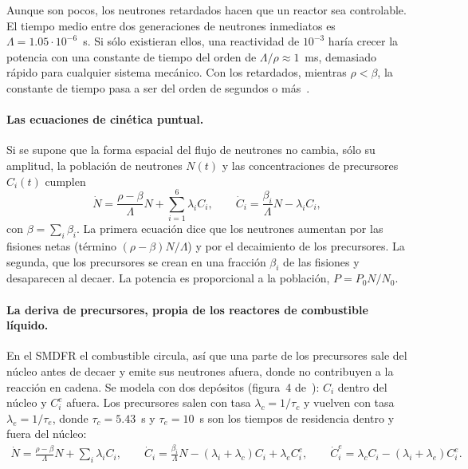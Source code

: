Aunque son pocos, los neutrones retardados hacen que un reactor sea controlable. El tiempo
medio entre dos generaciones de neutrones inmediatos es $\Lambda=1.05\cdot10^{-6}$~s. Si sólo
existieran ellos, una reactividad de $10^{-3}$ haría crecer la potencia con una constante de
tiempo del orden de $\Lambda/\rho\approx1$~ms, demasiado rápido para cualquier sistema
mecánico. Con los retardados, mientras $\rho<\beta$, la constante de tiempo pasa a ser del
orden de segundos o más~\cite{hetrick1971}.

\paragraph{Las ecuaciones de cinética puntual.} Si se supone que la forma espacial del flujo
de neutrones no cambia, sólo su amplitud, la población de neutrones $N(t)$ y las
concentraciones de precursores $C_i(t)$ cumplen
\[
\dot N=\frac{\rho-\beta}{\Lambda}N+\sum_{i=1}^{6}\lambda_iC_i,\qquad
\dot C_i=\frac{\beta_i}{\Lambda}N-\lambda_iC_i,
\]
con $\beta=\sum_i\beta_i$. La primera ecuación dice que los neutrones aumentan por las
fisiones netas (término $(\rho-\beta)N/\Lambda$) y por el decaimiento de los precursores. La
segunda, que los precursores se crean en una fracción $\beta_i$ de las fisiones y
desaparecen al decaer. La potencia es proporcional a la población, $P=P_0N/N_0$.

\paragraph{La deriva de precursores, propia de los reactores de combustible líquido.} En el
SMDFR el combustible circula, así que una parte de los precursores sale del núcleo antes de
decaer y emite sus neutrones afuera, donde no contribuyen a la reacción en cadena. Se modela
con dos depósitos (figura~4 de~\cite{liu2021}): $C_i$ dentro del núcleo y $C^e_i$ afuera. Los
precursores salen con tasa $\lambda_c=1/\tau_c$ y vuelven con tasa $\lambda_e=1/\tau_e$, donde
$\tau_c=5.43$~s y $\tau_e=10$~s son los tiempos de residencia dentro y fuera del núcleo:
\begin{gather*}
\dot N=\tfrac{\rho-\beta}{\Lambda}N+\textstyle\sum_i\lambda_iC_i,\qquad
\dot C_i=\tfrac{\beta_i}{\Lambda}N-(\lambda_i+\lambda_c)C_i+\lambda_eC^e_i,\qquad
\dot C^e_i=\lambda_cC_i-(\lambda_i+\lambda_e)C^e_i .
\end{gather*}

